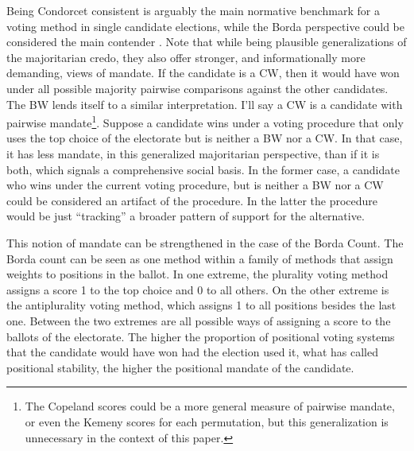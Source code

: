\documentclass[hidelinks,11pt]{article}
\begin{document}
Being Condorcet consistent is arguably the main normative benchmark for a voting
method in single candidate elections, while the Borda perspective could be
considered the main contender \parencite{regenwetter2006behavioral,
  felsenthal2011review}. Note that while being plausible generalizations of the
majoritarian credo, they also offer stronger, and informationally more
demanding, views of mandate. If the candidate is a CW, then it would have won
under all possible majority pairwise comparisons against the other candidates.
The BW lends itself to a similar interpretation. I'll say a CW is a candidate
with pairwise mandate\footnote{The Copeland scores could be a more general
  measure of pairwise mandate, or even the Kemeny scores for each permutation,
  but this generalization is unnecessary in the context of this paper.}. Suppose
a candidate wins under a voting procedure that only uses the top choice of the
electorate but is neither a BW nor a CW. In that case, it has less mandate, in
this generalized majoritarian perspective, than if it is both, which signals a
comprehensive social basis. In the former case, a candidate who wins under the
current voting procedure, but is neither a BW nor a CW could be considered an
artifact of the procedure. In the latter the procedure would be just
``tracking'' a broader pattern of support for the alternative.

This notion of mandate can be strengthened in the case of the Borda Count. The
Borda count can be seen as one method within a family of methods that assign
weights to positions in the ballot. In one extreme, the plurality voting method
assigns a score 1 to the top choice and 0 to all others. On the other extreme is
the antiplurality voting method, which assigns 1 to all positions besides the
last one. Between the two extremes are all possible ways of assigning a score to
the ballots of the electorate. The higher the proportion of positional voting
systems that the candidate would have won had the election used it, what
\textcite{tabarrok2001president} has called positional stability, the higher the
positional mandate of the candidate.

\end{document}
